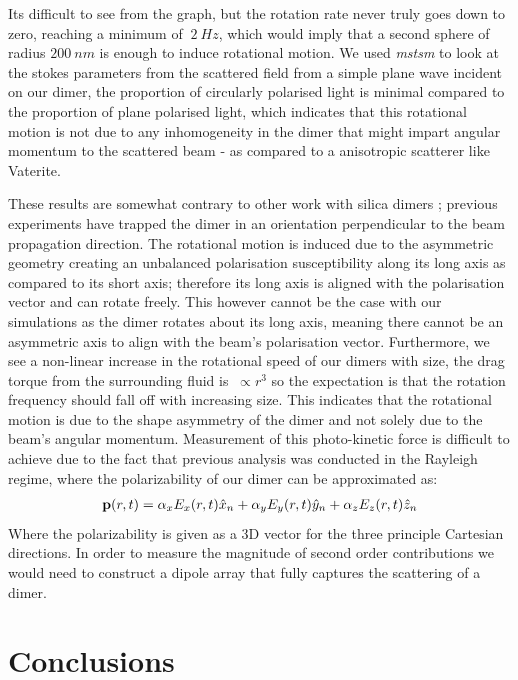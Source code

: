 Its difficult to see from the graph, but the rotation rate never truly goes down to zero, reaching a minimum of $~2\ Hz$, which would imply that a second sphere of radius $200\ nm$ is enough to induce rotational motion. We used \textit{mstsm} to look at the stokes parameters from the scattered field from a simple plane wave incident on our dimer, the proportion of circularly polarised light is minimal compared to the proportion of plane polarised light, which indicates that this rotational motion is not due to any inhomogeneity in the dimer that might impart angular momentum to the scattered beam - as compared to a anisotropic scatterer like Vaterite.

These results are somewhat contrary to other work with silica dimers \cite{Ahn2018, Debuysschere2023,Reimann2018}; previous experiments have trapped the dimer in an orientation perpendicular to the beam propagation direction. The rotational motion is induced due to the asymmetric geometry creating an unbalanced polarisation susceptibility along its long axis as compared to its short axis; therefore its long axis is aligned with the polarisation vector and can rotate freely\cite{Ahn2018}. This however cannot be the case with our simulations as the dimer rotates about its long axis, meaning there cannot be an asymmetric axis to align with the beam's polarisation vector. Furthermore, we see a non-linear increase in the rotational speed of our dimers with size, the drag torque from the surrounding fluid is $~\propto r^3$ so the expectation is that the rotation frequency should fall off with increasing size. This indicates that the rotational motion is due to the shape asymmetry of the dimer and not solely due to the beam's angular momentum. Measurement of this photo-kinetic force is difficult to achieve due to the fact that previous analysis was conducted in the Rayleigh regime, where the polarizability of our dimer can be approximated as:
\begin{align}
	\bold{p}(r,t) = \alpha_xE_x(r,t)\hat{x}_n +\alpha_yE_y(r,t)\hat{y}_n +\alpha_zE_z(r,t)\hat{z}_n
\end{align}
Where the polarizability is given as a 3D vector for the three principle Cartesian directions. In order to measure the magnitude of second order contributions we would need to construct a dipole array that fully captures the scattering of a dimer. 

\section{Conclusions}
